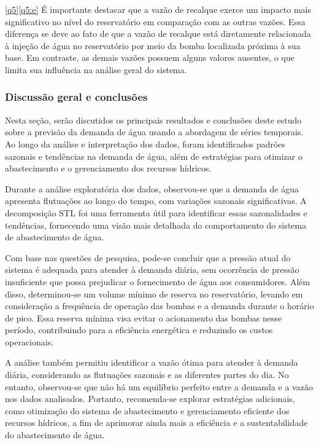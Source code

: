 \ref{q5}\ref{q5:e} É importante destacar que a vazão de recalque exerce um impacto mais significativo no nível do reservatório em comparação com as outras vazões. Essa diferença se deve ao fato de que a vazão de recalque está diretamente relacionada à injeção de água no reservatório por meio da bomba localizada próxima à sua base. Em contraste, as demais vazões possuem alguns valores ausentes, o que limita sua influência na análise geral do sistema.



\subsubsection{Discuss\~ao geral e conclus\~oes}

Nesta seção, serão discutidos os principais resultados e conclusões deste estudo sobre a previsão da demanda de água usando a abordagem de séries temporais. Ao longo da análise e interpretação dos dados, foram identificados padrões sazonais e tendências na demanda de água, além de estratégias para otimizar o abastecimento e o gerenciamento dos recursos hídricos.

Durante a análise exploratória dos dados, observou-se que a demanda de água apresenta flutuações ao longo do tempo, com variações sazonais significativas. A decomposição STL foi uma ferramenta útil para identificar essas sazonalidades e tendências, fornecendo uma visão mais detalhada do comportamento do sistema de abastecimento de água.

Com base nas questões de pesquisa, pode-se concluir que a pressão atual do sistema é adequada para atender à demanda diária, sem ocorrência de pressão insuficiente que possa prejudicar o fornecimento de água aos consumidores. Além disso, determinou-se um volume mínimo de reserva no reservatório, levando em consideração a frequência de operação das bombas e a demanda durante o horário de pico. Essa reserva mínima visa evitar o acionamento das bombas nesse período, contribuindo para a eficiência energética e reduzindo os custos operacionais.

A análise também permitiu identificar a vazão ótima para atender à demanda diária, considerando as flutuações sazonais e as diferentes partes do dia. No entanto, observou-se que não há um equilíbrio perfeito entre a demanda e a vazão nos dados analisados. Portanto, recomenda-se explorar estratégias adicionais, como otimização do sistema de abastecimento e gerenciamento eficiente dos recursos hídricos, a fim de aprimorar ainda mais a eficiência e a sustentabilidade do abastecimento de água.

